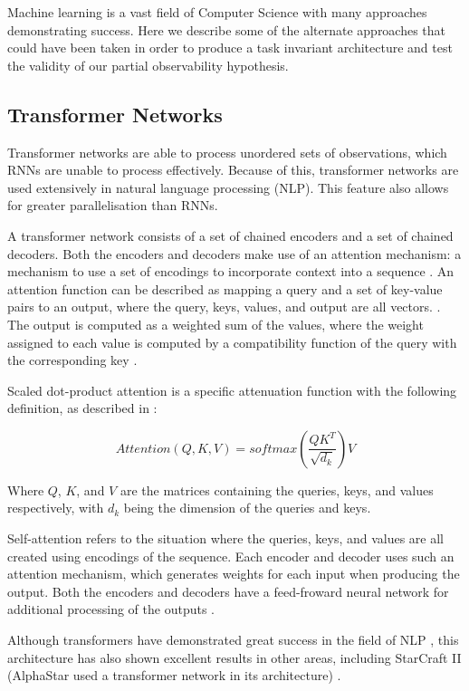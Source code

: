 Machine learning is a vast field of Computer Science with many approaches demonstrating success. Here we describe some of the alternate approaches that could have been taken in order to produce a task invariant architecture and test the validity of our partial observability hypothesis.

\subsection{Transformer Networks}

Transformer networks are able to process unordered sets of observations, which RNNs are unable to process effectively. Because of this, transformer networks are used extensively in natural language processing (NLP). This feature also allows for greater parallelisation than RNNs.

A transformer network consists of a set of chained encoders and a set of chained decoders. Both the encoders and decoders make use of an attention mechanism: a mechanism to use a set of encodings to incorporate context into a sequence \cite{illustratedtransformer}. An attention function can be described as mapping a query and a set of key-value pairs to an output, where the query, keys, values, and output are all vectors. \cite{attention}. The output is computed as a weighted sum of the values, where the weight assigned to each value is computed by a compatibility function of the query with the corresponding key \cite{attention}.

Scaled dot-product attention is a specific attenuation function with the following definition, as described in \cite{attention}:

\[
Attention(Q,K,V)=softmax(\frac{QK^T}{\sqrt{d_k}})V
\]

Where $Q$, $K$, and $V$ are the matrices containing the queries, keys, and values respectively, with $d_k$ being the dimension of the queries and keys.

Self-attention refers to the situation where the queries, keys, and values are all created using encodings of the sequence. Each encoder and decoder uses such an attention mechanism, which generates weights for each input when producing the output. Both the encoders and decoders have a feed-froward neural network for additional processing of the outputs \cite{illustratedtransformer}.

Although transformers have demonstrated great success in the field of NLP \cite{attention}, this architecture has also shown excellent results in other areas, including StarCraft II (AlphaStar used a transformer network in its architecture) \cite{alphastar}.

